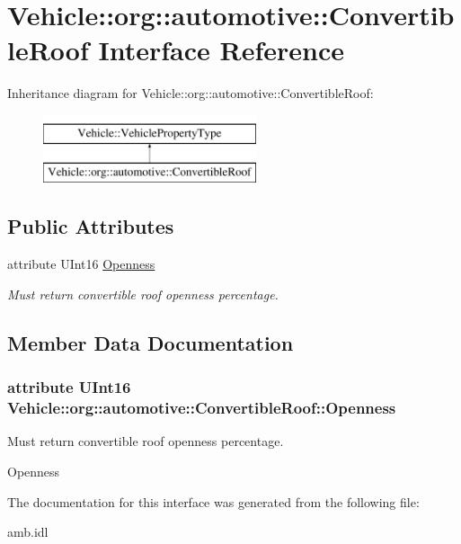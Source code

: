 \hypertarget{interfaceVehicle_1_1org_1_1automotive_1_1ConvertibleRoof}{\section{Vehicle\-:\-:org\-:\-:automotive\-:\-:Convertible\-Roof Interface Reference}
\label{interfaceVehicle_1_1org_1_1automotive_1_1ConvertibleRoof}
}
Inheritance diagram for Vehicle\-:\-:org\-:\-:automotive\-:\-:Convertible\-Roof\-:\begin{figure}[H]
\begin{center}
\leavevmode
\includegraphics[height=2.000000cm]{interfaceVehicle_1_1org_1_1automotive_1_1ConvertibleRoof}
\end{center}
\end{figure}
\subsection*{Public Attributes}
\begin{DoxyCompactItemize}
\item 
attribute U\-Int16 \hyperlink{interfaceVehicle_1_1org_1_1automotive_1_1ConvertibleRoof_a8013b935c736456f7fb238a068203e56}{Openness}
\begin{DoxyCompactList}\small\item\em Must return convertible roof openness percentage. \end{DoxyCompactList}\end{DoxyCompactItemize}


\subsection{Member Data Documentation}
\hypertarget{interfaceVehicle_1_1org_1_1automotive_1_1ConvertibleRoof_a8013b935c736456f7fb238a068203e56}{
\subsubsection[{Openness}]{\setlength{\rightskip}{0pt plus 5cm}attribute U\-Int16 Vehicle\-::org\-::automotive\-::\-Convertible\-Roof\-::\-Openness}}\label{interfaceVehicle_1_1org_1_1automotive_1_1ConvertibleRoof_a8013b935c736456f7fb238a068203e56}


Must return convertible roof openness percentage. 

Openness 

The documentation for this interface was generated from the following file\-:\begin{DoxyCompactItemize}
\item 
amb.\-idl\end{DoxyCompactItemize}
